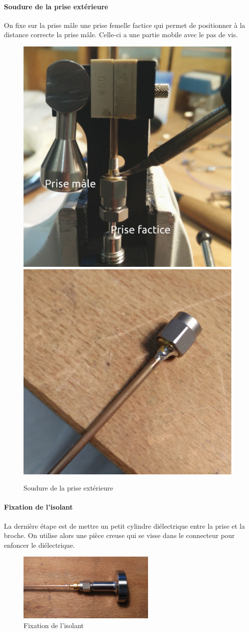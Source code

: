 \paragraph*{Soudure de la prise extérieure} On fixe sur la prise mâle une prise femelle factice qui permet de positionner à la distance correcte la prise mâle. Celle-ci a une partie mobile avec le pas de vis.
\begin{figure}[ht]
    \begin{center}
        \includegraphics[height=0.48\textwidth]{Images/Coax/4}
        \quad
        \includegraphics[height=0.48\textwidth]{Images/Coax/5}
        \caption{Soudure de la prise extérieure}
        \label{coax_soudure_exterieur}
    \end{center}
\end{figure}

\paragraph*{Fixation de l’isolant}  La dernière étape est de mettre un petit cylindre diélectrique entre la prise et la broche. On utilise alors une pièce creuse qui se visse dans le connecteur pour enfoncer le diélectrique.

\begin{figure}[ht]
    \begin{center}
        \includegraphics[width=0.60\textwidth]{Images/Coax/6}
        \caption{Fixation de l’isolant}
        \label{coax_fixation_isolant}
    \end{center}
\end{figure}

